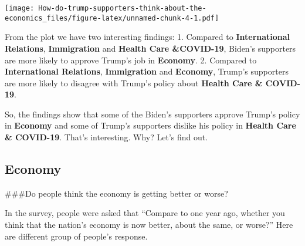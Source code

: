 \documentclass[
]{article}
\newenvironment{Shaded}{\begin{snugshade}}{\end{snugshade}}
\newcommand{\DataTypeTok}[1]{\textcolor[rgb]{0.13,0.29,0.53}{#1}}
\newcommand{\DecValTok}[1]{\textcolor[rgb]{0.00,0.00,0.81}{#1}}
\newcommand{\FloatTok}[1]{\textcolor[rgb]{0.00,0.00,0.81}{#1}}
\newcommand{\KeywordTok}[1]{\textcolor[rgb]{0.13,0.29,0.53}{\textbf{#1}}}
\newcommand{\NormalTok}[1]{#1}
\newcommand{\OperatorTok}[1]{\textcolor[rgb]{0.81,0.36,0.00}{\textbf{#1}}}
\newcommand{\OtherTok}[1]{\textcolor[rgb]{0.56,0.35,0.01}{#1}}
\newcommand{\StringTok}[1]{\textcolor[rgb]{0.31,0.60,0.02}{#1}}
\begin{document}
\texttt{[image: How-do-trump-supporters-think-about-the-economics\_files/figure-latex/unnamed-chunk-4-1.pdf]}

From the plot we have two interesting findings: 1. Compared to
\textbf{International Relations}, \textbf{Immigration} and
\textbf{Health Care \&COVID-19}, Biden's supporters are more likely to
approve Trump's job in \textbf{Economy}. 2. Compared to
\textbf{International Relations}, \textbf{Immigration} and
\textbf{Economy}, Trump's supporters are more likely to disagree with
Trump's policy about \textbf{Health Care \& COVID-19}.

So, the findings show that some of the Biden's supporters approve
Trump's policy in \textbf{Economy} and some of Trump's supporters
dislike his policy in \textbf{Health Care \& COVID-19}. That's
interesting. Why? Let's find out.

\hypertarget{economy}{%
\subsection{Economy}\label{economy}}

\#\#\#Do people think the economy is getting better or worse?

In the survey, people were asked that ``Compare to one year ago, whether
you think that the nation's economy is now better, about the same, or
worse?'' Here are different group of people's response.

\begin{Shaded}
\end{Shaded}
\end{document}
